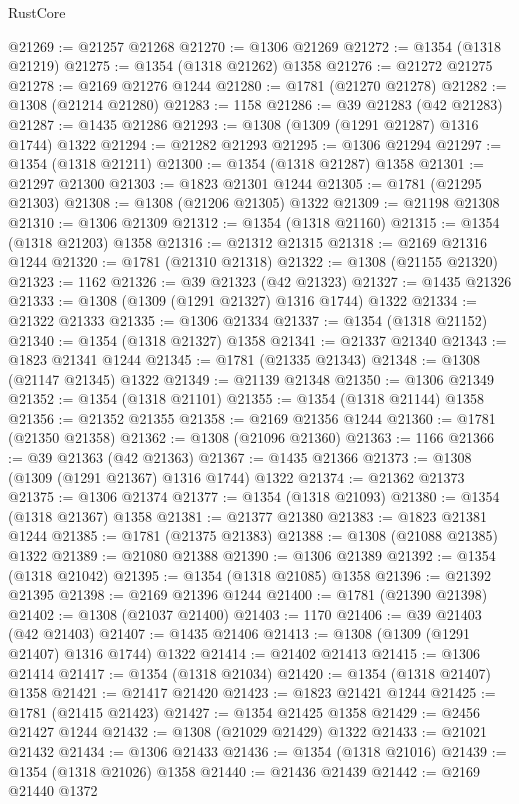 \begin{lexlean}{RustCore}
\begin{coremodule}
@21269 := @21257 @21268
@21270 := @1306 @21269
@21272 := @1354 (@1318 @21219)
@21275 := @1354 (@1318 @21262) @1358
@21276 := @21272 @21275
@21278 := @2169 @21276 @1244
@21280 := @1781 (@21270 @21278)
@21282 := @1308 (@21214 @21280)
@21283 := 1158
@21286 := @39 @21283 (@42 @21283)
@21287 := @1435 @21286
@21293 := @1308 (@1309 (@1291 @21287) @1316 @1744) @1322
@21294 := @21282 @21293
@21295 := @1306 @21294
@21297 := @1354 (@1318 @21211)
@21300 := @1354 (@1318 @21287) @1358
@21301 := @21297 @21300
@21303 := @1823 @21301 @1244
@21305 := @1781 (@21295 @21303)
@21308 := @1308 (@21206 @21305) @1322
@21309 := @21198 @21308
@21310 := @1306 @21309
@21312 := @1354 (@1318 @21160)
@21315 := @1354 (@1318 @21203) @1358
@21316 := @21312 @21315
@21318 := @2169 @21316 @1244
@21320 := @1781 (@21310 @21318)
@21322 := @1308 (@21155 @21320)
@21323 := 1162
@21326 := @39 @21323 (@42 @21323)
@21327 := @1435 @21326
@21333 := @1308 (@1309 (@1291 @21327) @1316 @1744) @1322
@21334 := @21322 @21333
@21335 := @1306 @21334
@21337 := @1354 (@1318 @21152)
@21340 := @1354 (@1318 @21327) @1358
@21341 := @21337 @21340
@21343 := @1823 @21341 @1244
@21345 := @1781 (@21335 @21343)
@21348 := @1308 (@21147 @21345) @1322
@21349 := @21139 @21348
@21350 := @1306 @21349
@21352 := @1354 (@1318 @21101)
@21355 := @1354 (@1318 @21144) @1358
@21356 := @21352 @21355
@21358 := @2169 @21356 @1244
@21360 := @1781 (@21350 @21358)
@21362 := @1308 (@21096 @21360)
@21363 := 1166
@21366 := @39 @21363 (@42 @21363)
@21367 := @1435 @21366
@21373 := @1308 (@1309 (@1291 @21367) @1316 @1744) @1322
@21374 := @21362 @21373
@21375 := @1306 @21374
@21377 := @1354 (@1318 @21093)
@21380 := @1354 (@1318 @21367) @1358
@21381 := @21377 @21380
@21383 := @1823 @21381 @1244
@21385 := @1781 (@21375 @21383)
@21388 := @1308 (@21088 @21385) @1322
@21389 := @21080 @21388
@21390 := @1306 @21389
@21392 := @1354 (@1318 @21042)
@21395 := @1354 (@1318 @21085) @1358
@21396 := @21392 @21395
@21398 := @2169 @21396 @1244
@21400 := @1781 (@21390 @21398)
@21402 := @1308 (@21037 @21400)
@21403 := 1170
@21406 := @39 @21403 (@42 @21403)
@21407 := @1435 @21406
@21413 := @1308 (@1309 (@1291 @21407) @1316 @1744) @1322
@21414 := @21402 @21413
@21415 := @1306 @21414
@21417 := @1354 (@1318 @21034)
@21420 := @1354 (@1318 @21407) @1358
@21421 := @21417 @21420
@21423 := @1823 @21421 @1244
@21425 := @1781 (@21415 @21423)
@21427 := @1354 @21425 @1358
@21429 := @2456 @21427 @1244
@21432 := @1308 (@21029 @21429) @1322
@21433 := @21021 @21432
@21434 := @1306 @21433
@21436 := @1354 (@1318 @21016)
@21439 := @1354 (@1318 @21026) @1358
@21440 := @21436 @21439
@21442 := @2169 @21440 @1372

\end{coremodule}
\end{lexlean}
